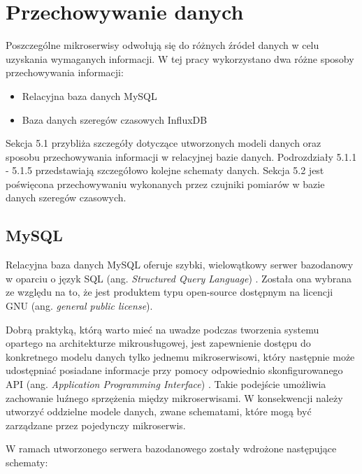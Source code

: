 \newpage
\section{Przechowywanie danych}

Poszczególne mikroserwisy odwołują się do różnych źródeł danych w celu uzyskania 
wymaganych informacji. W tej pracy wykorzystano dwa różne sposoby przechowywania 
informacji:

\begin{itemize} %
    \item Relacyjna baza danych MySQL
    \item Baza danych szeregów czasowych InfluxDB
\end{itemize}

Sekcja 5.1 przybliża szczegóły dotyczące utworzonych modeli danych oraz sposobu 
przechowywania informacji w relacyjnej bazie danych. Podrozdziały 5.1.1 - 5.1.5 przedstawiają
szczegółowo kolejne schematy danych. Sekcja 5.2 jest poświęcona przechowywaniu
wykonanych przez czujniki pomiarów w bazie danych szeregów czasowych.

\subsection{MySQL}

Relacyjna baza danych MySQL oferuje szybki, wielowątkowy serwer bazodanowy w oparciu 
o język SQL (ang. \textit{Structured Query Language})
\cite{mysql2022}. Została ona wybrana ze względu na to, że 
jest produktem typu open-source dostępnym na licencji GNU (ang. \textit{general public license}). 

Dobrą praktyką, którą warto mieć na uwadze podczas tworzenia systemu opartego na 
architekturze mikrousługowej, jest zapewnienie dostępu do konkretnego modelu danych tylko 
jednemu mikroserwisowi, który następnie może udostępniać posiadane informacje przy pomocy odpowiednio 
skonfigurowanego API (ang. \textit{Application Programming Interface}) \cite{richardson2021}. Takie podejście umożliwia zachowanie luźnego 
sprzężenia między mikroserwisami. W konsekwencji należy utworzyć oddzielne modele 
danych, zwane schematami, które mogą być zarządzane przez pojedynczy mikroserwis.

W ramach utworzonego serwera bazodanowego zostały wdrożone następujące schematy:

